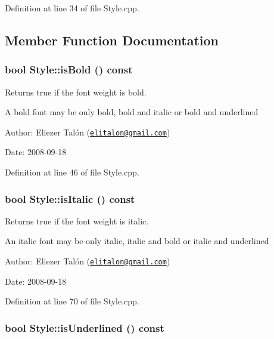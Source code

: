 Definition at line 34 of file Style.cpp.

\subsection{Member Function Documentation}
\hypertarget{class_style_59d23709575c5e6e5434ef0af5ff94b6}{
\subsubsection[isBold]{\setlength{\rightskip}{0pt plus 5cm}bool Style::isBold () const}}
\label{class_style_59d23709575c5e6e5434ef0af5ff94b6}


Returns true if the font weight is bold. 

A bold font may be only bold, bold and italic or bold and underlined

\begin{Desc}
\item[Author:]Eliezer Talón (\href{mailto:elitalon@gmail.com}{\tt elitalon@gmail.com}) \end{Desc}
\begin{Desc}
\item[Date:]2008-09-18 \end{Desc}


Definition at line 46 of file Style.cpp.\hypertarget{class_style_5d57a686b93123e8ca5f8f91afb596c1}{
\subsubsection[isItalic]{\setlength{\rightskip}{0pt plus 5cm}bool Style::isItalic () const}}
\label{class_style_5d57a686b93123e8ca5f8f91afb596c1}


Returns true if the font weight is italic. 

An italic font may be only italic, italic and bold or italic and underlined

\begin{Desc}
\item[Author:]Eliezer Talón (\href{mailto:elitalon@gmail.com}{\tt elitalon@gmail.com}) \end{Desc}
\begin{Desc}
\item[Date:]2008-09-18 \end{Desc}


Definition at line 70 of file Style.cpp.\hypertarget{class_style_d1fcc32d8b565aae007012eb603fedcd}{
\subsubsection[isUnderlined]{\setlength{\rightskip}{0pt plus 5cm}bool Style::isUnderlined () const}}
\label{class_style_d1fcc32d8b565aae007012eb603fedcd}


